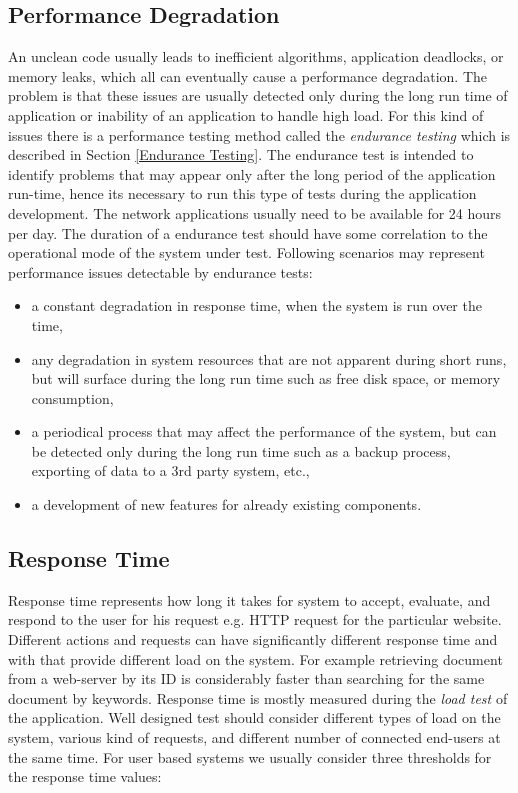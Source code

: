 \subsection*{Performance Degradation}
\label{Performance Degradation}
An unclean code usually leads to inefficient algorithms, application deadlocks, or memory leaks, which all can eventually cause a performance degradation. The problem is that these issues are usually detected only during the long run time of application or inability of an application to handle high load. For this kind of issues there is a performance testing method called the \emph{endurance testing} \cite{BUCH:4TYPES, Manzor:APTB} which is described in Section \ref{Endurance Testing}. The endurance test is intended to identify problems that may appear only after the long period of the application run-time\footnotemark{}, hence its necessary to run this type of tests during the application development. The network applications usually need to be available for 24 hours per day. The duration of a endurance test should have some correlation to the operational mode of the system under test. Following scenarios may represent performance issues detectable by endurance tests:

\begin{itemize}
	\setlength\itemsep{0em}
	\item a constant degradation in response time, when the system is run over the time,
	\item any degradation in system resources that are not apparent during short runs, but will surface during the long run time such as free disk space, or memory consumption,
	\item a periodical process that may affect the performance of the system, but can be detected only during the long run time such as a backup process, exporting of data to a 3rd party system, etc.,
	\item a development of new features for already existing components.
\end{itemize}


\subsection*{Response Time}
\label{Response Time 1}
Response time represents how long it takes for system to accept, evaluate, and respond to the user for his request e.g. HTTP request for the particular website. Different actions and requests can have significantly different response time and with that provide different load on the system. For example retrieving document from a web-server by its ID is considerably faster than searching for the same document by keywords. Response time is mostly measured during the \emph{load test} \cite{Manzor:APTB} of the application. Well designed test should consider different types of load on the system, various kind of requests, and different number of connected end-users at the same time. For user based systems we usually consider three thresholds for the response time values:


